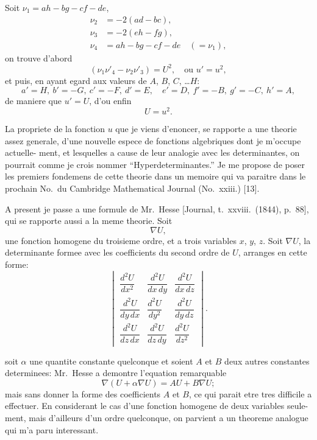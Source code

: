\documentclass[11pt,a4paper]{book}
\begin{document}
Soit $\nu_1 = ah - bg - cf - de$,
\begin{align*}
\nu_2 &= -2(ad - bc),\\
\nu_3 &= -2(eh - fg),\\
\nu_4 &= ah - bg - cf - de \quad (= \nu_1),
\end{align*}
on trouve d'abord
\[
(\nu_1\nu'_4 - \nu_2\nu'_3) = U^2,\quad \text{ou } u' = u^2,
\]
et puis, en ayant egard aux valeurs de $A$, $B$, $C$, \ldots $H$:
\[
a' = H,\ b' = -G,\ c' = -F,\ d' = E,\quad
e' = D,\ f' = -B,\ g' = -C,\ h' = A,
\]
de maniere que $u' = U$, d'ou enfin
\[
U = u^2.
\]

\newpage
\setcounter{page}{114}

La propriete de la fonction $u$ que je viens d'enoncer, se rapporte a une theorie
assez generale, d'une nouvelle espece de fonctions algebriques dont je m'occupe actuelle-
ment, et lesquelles a cause de leur analogie avec les determinantes, on pourrait comme
je crois nommer ``Hyperdeterminantes.'' Je me propose de poser les premiers fondemens
de cette theorie dans un memoire qui va paraitre dans le prochain No.\ du Cambridge
Mathematical Journal (No.~xxiii.) [13].

A present je passe a une formule de Mr.~Hesse [Journal, t.~xxviii.~(1844), p.~88],
qui se rapporte aussi a la meme theorie. Soit
\[
\nabla U,
\]
une fonction homogene du troisieme ordre, et a trois variables $x$, $y$, $z$. Soit $\nabla U$, la
determinante formee avec les coefficients du second ordre de $U$, arranges en cette forme:
\[
\begin{vmatrix}
\dfrac{d^2U}{dx^2} & \dfrac{d^2U}{dx\,dy} & \dfrac{d^2U}{dx\,dz}\\[1.2ex]
\dfrac{d^2U}{dy\,dx} & \dfrac{d^2U}{dy^2} & \dfrac{d^2U}{dy\,dz}\\[1.2ex]
\dfrac{d^2U}{dz\,dx} & \dfrac{d^2U}{dz\,dy} & \dfrac{d^2U}{dz^2}
\end{vmatrix}.
\]

\newpage
\setcounter{page}{115}

soit $\alpha$ une quantite constante quelconque et soient $A$ et $B$ deux autres constantes
determinees: Mr.~Hesse a demontre l'equation remarquable
\[
\nabla(U + \alpha \nabla U) = AU + B\nabla U;
\]
mais sans donner la forme des coefficients $A$ et $B$, ce qui parait etre tres difficile
a effectuer. En considerant le cas d'une fonction homogene de deux variables seule-
ment, mais d'ailleurs d'un ordre quelconque, on parvient a un theoreme analogue qui
m'a paru interessant.
\end{document}
